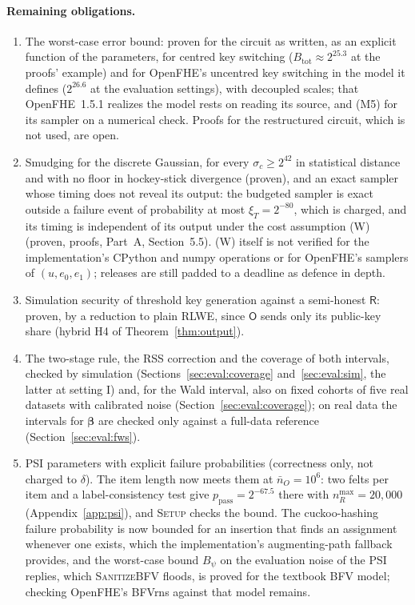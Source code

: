 \documentclass[11pt]{article}
\theoremstyle{definition}
\theoremstyle{plain}
\newcommand{\bbeta}{\boldsymbol{\beta}}
\newcommand{\Party}[1]{\textsf{#1}}
\newcommand{\Rp}{\Party{R}}
\newcommand{\Op}{\Party{O}}
\begin{document}
\paragraph{Remaining obligations.}
\begin{enumerate}[noitemsep, label=O\arabic*.]
  \item The worst-case error bound: proven for the circuit as written, as an explicit function of the parameters, for centred key switching ($B_{\mathrm{tot}} \approx 2^{25.3}$ at the proofs' example) and for OpenFHE's uncentred key switching in the model it defines ($2^{26.6}$ at the evaluation settings), with decoupled scales; that OpenFHE~1.5.1 realizes the model rests on reading its source, and (M5) for its sampler on a numerical check. Proofs for the restructured circuit, which is not used, are open.
  \item Smudging for the discrete Gaussian, for every $\sigma_c \ge 2^{42}$ in statistical distance and with no floor in hockey-stick divergence (proven), and an exact sampler whose timing does not reveal its output: the budgeted sampler is exact outside a failure event of probability at most $\xi_T = 2^{-80}$, which is charged, and its timing is independent of its output under the cost assumption (W) (proven, proofs, Part~A, Section~5.5). (W) itself is not verified for the implementation's CPython and numpy operations or for OpenFHE's samplers of $(u, e_0, e_1)$; releases are still padded to a deadline as defence in depth.
  \item Simulation security of threshold key generation against a semi-honest $\Rp$: proven, by a reduction to plain RLWE, since $\Op$ sends only its public-key share (hybrid H4 of Theorem~\ref{thm:output}).
  \item The two-stage rule, the RSS correction and the coverage of both intervals, checked by simulation (Sections~\ref{sec:eval:coverage} and~\ref{sec:eval:sim}, the latter at setting I) and, for the Wald interval, also on fixed cohorts of five real datasets with calibrated noise (Section~\ref{sec:eval:coverage}); on real data the intervals for $\bbeta$ are checked only against a full-data reference (Section~\ref{sec:eval:fws}).
  \item PSI parameters with explicit failure probabilities (correctness only, not charged to $\delta$). The item length now meets them at $\bar n_O = 10^6$: two felts per item and a label-consistency test give $p_{\mathrm{pass}} = 2^{-67.5}$ there with $n_R^{\max} = 20{,}000$ (Appendix~\ref{app:psi}), and \textsc{Setup} checks the bound. The cuckoo-hashing failure probability is now bounded for an insertion that finds an assignment whenever one exists, which the implementation's augmenting-path fallback provides, and the worst-case bound $B_\psi$ on the evaluation noise of the PSI replies, which \textsc{SanitizeBFV} floods, is proved for the textbook BFV model; checking OpenFHE's BFVrns against that model remains.
\end{enumerate}
\end{document}

